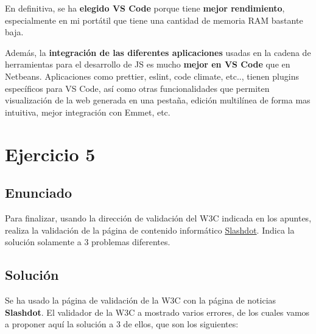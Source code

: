 En definitiva, se ha \textbf{elegido VS Code} porque tiene \textbf{mejor rendimiento}, especialmente en mi portátil que tiene una cantidad de memoria RAM bastante baja.

Además, la \textbf{integración de las diferentes aplicaciones} usadas en la cadena de herramientas para el desarrollo de JS es mucho \textbf{mejor en VS Code} que en Netbeans. Aplicaciones como prettier, eslint, code climate, etc.., tienen plugins específicos para VS Code, así como otras funcionalidades que permiten visualización de la web generada en una pestaña, edición multilínea de forma mas intuitiva, mejor integración con Emmet, etc.

\section{Ejercicio 5}
\subsection{Enunciado}
Para finalizar, usando la dirección de validación del W3C indicada en los apuntes, realiza la validación de la página de contenido informático \href{https://slashdot.org/}{Slashdot}. Indica la solución solamente a 3 problemas diferentes.

\subsection{Solución}
Se ha usado la página de validación de la W3C con la página de noticias \textbf{Slashdot}. El validador de la W3C a mostrado varios errores, de los cuales vamos a proponer aquí la solución a 3 de ellos, que son los siguientes:

